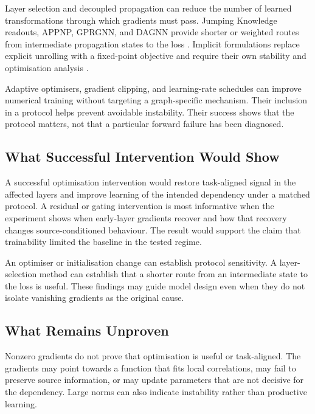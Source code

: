 Layer selection and decoupled propagation can reduce the number of learned transformations through which gradients must pass.
Jumping Knowledge readouts, APPNP, GPRGNN, and DAGNN provide shorter or weighted routes from intermediate propagation states to the loss \cite{xu2018jknet,gasteiger2019appnp,chien2021adaptive,liu2020dagnn}.
Implicit formulations replace explicit unrolling with a fixed-point objective and require their own stability and optimisation analysis \cite{gu2020implicit,liu2021eignn,chen2022optimization}.

Adaptive optimisers, gradient clipping, and learning-rate schedules can improve numerical training without targeting a graph-specific mechanism.
Their inclusion in a protocol helps prevent avoidable instability.
Their success shows that the protocol matters, not that a particular forward failure has been diagnosed.

\subsection{What Successful Intervention Would Show}

A successful optimisation intervention would restore task-aligned signal in the affected layers and improve learning of the intended dependency under a matched protocol.
A residual or gating intervention is most informative when the experiment shows when early-layer gradients recover and how that recovery changes source-conditioned behaviour.
The result would support the claim that trainability limited the baseline in the tested regime.

An optimiser or initialisation change can establish protocol sensitivity.
A layer-selection method can establish that a shorter route from an intermediate state to the loss is useful.
These findings may guide model design even when they do not isolate vanishing gradients as the original cause.

\subsection{What Remains Unproven}

Nonzero gradients do not prove that optimisation is useful or task-aligned.
The gradients may point towards a function that fits local correlations, may fail to preserve source information, or may update parameters that are not decisive for the dependency.
Large norms can also indicate instability rather than productive learning.

